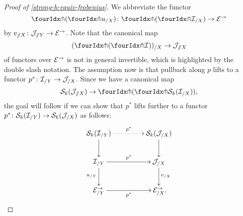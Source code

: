 \documentclass[reqno,10pt,a4paper,oneside,draft]{amsart}
\begin{document}
\begin{proof}[Proof of \cref{strong-h-equiv-frobenius}]
We abbreviate the functor
\[
\liftl{(\liftr{u_{/X}})} \co \liftl{(\liftr{\cal{I}_{/X}})} \to \catE^\to
\]
by $v_{\sslash X} \colon \mathcal{J}_{\sslash Y} \to \mathcal{E}^\to$.
Note that the canonical map
\[
  (\liftl{(\liftr{\cal{I}})})_{/X} \to \cal{J}_{\fakeslice X}
\]
of functors over $\mathcal{E}^\to$ is not in general invertible, which is highlighted by the double slash notation.
The assumption now is that pullback along $p$ lifts to a functor $p^* \colon \mathcal{I}_{/Y} \to \mathcal{J}_{/X}$.
Since we have a canonical map
\[
\cal{S}_k(\cal{J}_{\fakeslice X}) \to \liftl{(\liftr{\cal{S}_k(\cal{I}_{/X})})}
,\]
the goal will follow if we can show that $p^*$ lifts further to a functor $p^* \colon \mathcal{S}_k(\mathcal{I}_{/Y}) \to \mathcal{S}_k(\mathcal{J}_{/X})$ as follows:
\[
\xymatrix@C+2em{
  \cal{S}_k(\cal{I}_{/Y})
  \ar@{.>}[r]^{p^*}
  \ar[d]
&
  \cal{S}_k(\cal{J}_{/X})
  \ar[d]
\\
  \cal{I}_{/Y}
  \ar[r]^{p^*}
  \ar[d]_{u_{/Y}}
&
  \cal{J}_{/X}
  \ar[d]^{v_{/X}}
\\
  \catE_{/Y}^\to
  \ar[r]_{p^*}
&
  \catE_{/X}^\to
\rlap{.}}
\]


\end{proof}
\end{document}
